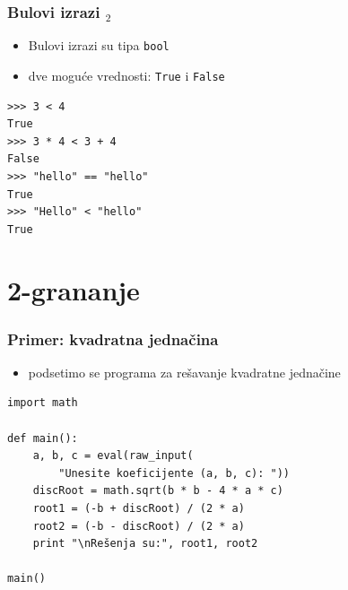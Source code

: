 \documentclass[utf8,compress]{beamer}
\begin{document}

\begin{frame}[fragile]
  \frametitle{Bulovi izrazi $_2$}
  \begin{itemize}
    \item Bulovi izrazi su tipa \texttt{bool} 
    \item dve moguće vrednosti: \texttt{True} i \texttt{False}
  \end{itemize}
\begin{verbatim}
>>> 3 < 4
True
>>> 3 * 4 < 3 + 4
False
>>> "hello" == "hello"
True
>>> "Hello" < "hello"
True
\end{verbatim}
\end{frame}

\section{2-grananje}

\begin{frame}[fragile]
  \frametitle{Primer: kvadratna jednačina}
  \begin{itemize}
    \item podsetimo se programa za rešavanje kvadratne jednačine
  \end{itemize}
\begin{verbatim}
import math

def main():
    a, b, c = eval(raw_input(
        "Unesite koeficijente (a, b, c): "))
    discRoot = math.sqrt(b * b - 4 * a * c)
    root1 = (-b + discRoot) / (2 * a)
    root2 = (-b - discRoot) / (2 * a)
    print "\nRešenja su:", root1, root2

main()
\end{verbatim}
\end{frame}
\end{document}
